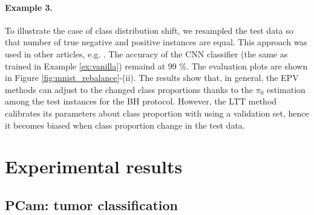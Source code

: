 \documentclass{article}
\begin{document}
\paragraph{Example 3.} To illustrate the case of class distribution shift, we resampled the test data so that number of true negative and positive instances are equal. This approach was used in other articles, e.g.  \cite{joseph_d__viviano__2019}. The accuracy of the CNN classifier (the same as trained in Example \ref{ex:vanilla}) remaind at 99 \%. The evaluation plots are shown in Figure \ref{fig:mnist_rebalance}-(ii). The results show that, in general, the EPV methods can adjust to the changed class proportions thanks to the $\pi_0$ estimation among the test instances for the BH protocol. However, the LTT method calibrates its parameters about class proportion with using a validation set, hence it becomes biased when class proportion change in the test data. 
%

\section{Experimental results}

\subsection{PCam: tumor classification}
\end{document}
